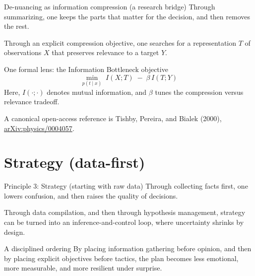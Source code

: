 \documentclass[presentation,aspectratio=169,11pt]{beamer}
\begin{document}
\begin{frame}{De-nuancing as information compression (a research bridge)}
\justifying
Through summarizing, one keeps the parts that matter for the decision, and then removes the rest.

\vspace{0.6em}
Through an explicit compression objective, one searches for a representation $T$ of observations $X$ that preserves relevance to a target $Y$.

\vspace{0.6em}
\begin{block}{One formal lens: the Information Bottleneck objective}
\justifying
\vspace{-0.5em}
$$
\min_{p(t\mid x)}\; I(X;T)\; -\; \beta\, I(T;Y)
$$
\vspace{-0.2em}
\small
Here, $I(\cdot;\cdot)$ denotes mutual information, and $\beta$ tunes the compression versus relevance tradeoff.
\end{block}

\vspace{0.3em}
\footnotesize
A canonical open-access reference is Tishby, Pereira, and Bialek (2000), \href{https://arxiv.org/abs/physics/0004057}{arXiv:physics/0004057}.
\end{frame}

\section{Strategy (data-first)}

\begin{frame}{Principle 3: Strategy (starting with raw data)}
\justifying
Through collecting facts first, one lowers confusion, and then raises the quality of decisions.

\vspace{0.6em}
Through data compilation, and then through hypothesis management, strategy can be turned into an inference-and-control loop, where uncertainty shrinks by design.

\vspace{0.8em}
\begin{block}{A disciplined ordering}
\justifying
By placing information gathering before opinion, and then by placing explicit objectives before tactics, the plan becomes less emotional, more measurable, and more resilient under surprise.
\end{block}
\end{frame}
\end{document}
